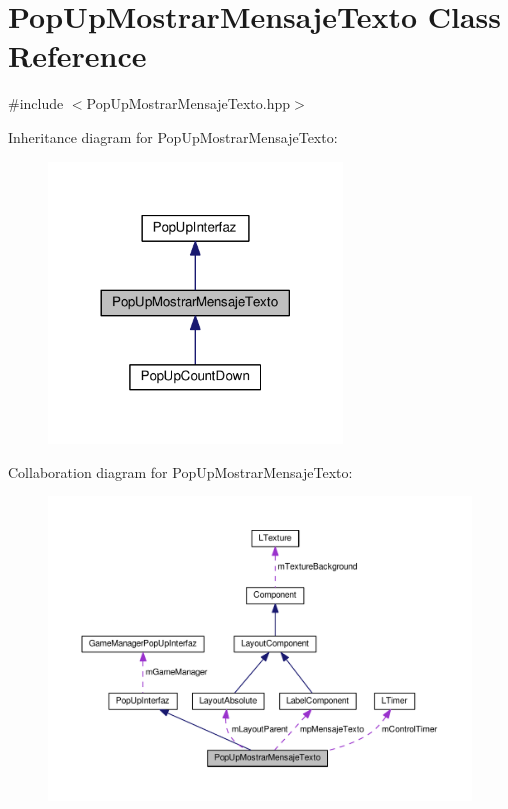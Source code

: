 \hypertarget{class_pop_up_mostrar_mensaje_texto}{}\section{Pop\+Up\+Mostrar\+Mensaje\+Texto Class Reference}
\label{class_pop_up_mostrar_mensaje_texto}


{\ttfamily \#include $<$Pop\+Up\+Mostrar\+Mensaje\+Texto.\+hpp$>$}



Inheritance diagram for Pop\+Up\+Mostrar\+Mensaje\+Texto\+:\nopagebreak
\begin{figure}[H]
\begin{center}
\leavevmode
\includegraphics[width=221pt]{class_pop_up_mostrar_mensaje_texto__inherit__graph}
\end{center}
\end{figure}


Collaboration diagram for Pop\+Up\+Mostrar\+Mensaje\+Texto\+:
\nopagebreak
\begin{figure}[H]
\begin{center}
\leavevmode
\includegraphics[width=350pt]{class_pop_up_mostrar_mensaje_texto__coll__graph}
\end{center}
\end{figure}
